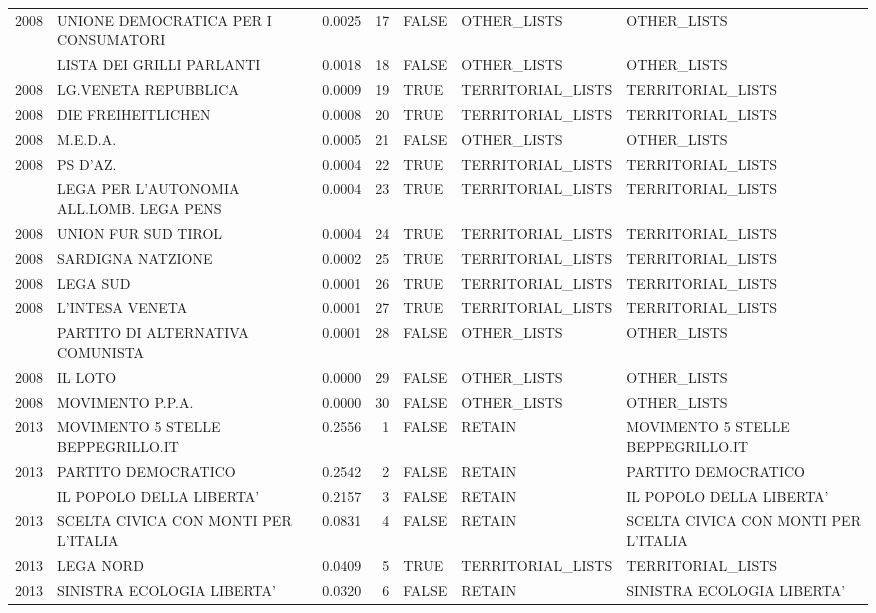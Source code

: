 \begin{longtable}[t]{rlrrlll}
2008 & UNIONE DEMOCRATICA PER I CONSUMATORI & 0.0025 & 17 & FALSE & OTHER\_LISTS & OTHER\_LISTS\\
\addlinespace
2008 & LISTA DEI GRILLI PARLANTI & 0.0018 & 18 & FALSE & OTHER\_LISTS & OTHER\_LISTS\\
2008 & LG.VENETA REPUBBLICA & 0.0009 & 19 & TRUE & TERRITORIAL\_LISTS & TERRITORIAL\_LISTS\\
2008 & DIE FREIHEITLICHEN & 0.0008 & 20 & TRUE & TERRITORIAL\_LISTS & TERRITORIAL\_LISTS\\
2008 & M.E.D.A. & 0.0005 & 21 & FALSE & OTHER\_LISTS & OTHER\_LISTS\\
2008 & PS D'AZ. & 0.0004 & 22 & TRUE & TERRITORIAL\_LISTS & TERRITORIAL\_LISTS\\
\addlinespace
2008 & LEGA PER L'AUTONOMIA ALL.LOMB. LEGA PENS & 0.0004 & 23 & TRUE & TERRITORIAL\_LISTS & TERRITORIAL\_LISTS\\
2008 & UNION FUR SUD TIROL & 0.0004 & 24 & TRUE & TERRITORIAL\_LISTS & TERRITORIAL\_LISTS\\
2008 & SARDIGNA NATZIONE & 0.0002 & 25 & TRUE & TERRITORIAL\_LISTS & TERRITORIAL\_LISTS\\
2008 & LEGA SUD & 0.0001 & 26 & TRUE & TERRITORIAL\_LISTS & TERRITORIAL\_LISTS\\
2008 & L'INTESA VENETA & 0.0001 & 27 & TRUE & TERRITORIAL\_LISTS & TERRITORIAL\_LISTS\\
\addlinespace
2008 & PARTITO DI ALTERNATIVA COMUNISTA & 0.0001 & 28 & FALSE & OTHER\_LISTS & OTHER\_LISTS\\
2008 & IL LOTO & 0.0000 & 29 & FALSE & OTHER\_LISTS & OTHER\_LISTS\\
2008 & MOVIMENTO P.P.A. & 0.0000 & 30 & FALSE & OTHER\_LISTS & OTHER\_LISTS\\
2013 & MOVIMENTO 5 STELLE BEPPEGRILLO.IT & 0.2556 & 1 & FALSE & RETAIN & MOVIMENTO 5 STELLE BEPPEGRILLO.IT\\
2013 & PARTITO DEMOCRATICO & 0.2542 & 2 & FALSE & RETAIN & PARTITO DEMOCRATICO\\
\addlinespace
2013 & IL POPOLO DELLA LIBERTA' & 0.2157 & 3 & FALSE & RETAIN & IL POPOLO DELLA LIBERTA'\\
2013 & SCELTA CIVICA CON MONTI PER L'ITALIA & 0.0831 & 4 & FALSE & RETAIN & SCELTA CIVICA CON MONTI PER L'ITALIA\\
2013 & LEGA NORD & 0.0409 & 5 & TRUE & TERRITORIAL\_LISTS & TERRITORIAL\_LISTS\\
2013 & SINISTRA ECOLOGIA LIBERTA' & 0.0320 & 6 & FALSE & RETAIN & SINISTRA ECOLOGIA LIBERTA'\\

\end{longtable}

